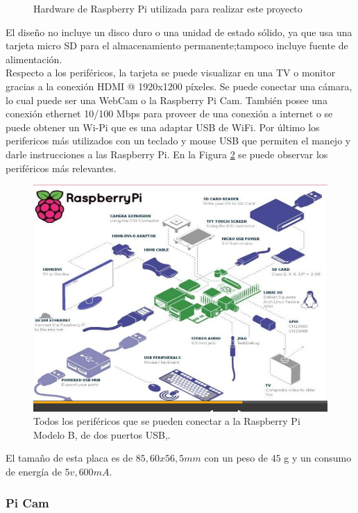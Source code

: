 \documentclass[letterpaper,12pt]{article}
\begin{document}
\begin{figure}[H]
\caption{Hardware de Raspberry Pi utilizada para realizar este proyecto}
\label{Fig:Rpi}
\end{figure}


El diseño no incluye un disco duro o una unidad de estado sólido, ya que usa una tarjeta micro SD para el almacenamiento permanente;tampoco incluye fuente de alimentación\cite{TrabajoRaspiUdeC}.\\
Respecto a los periféricos, la tarjeta se puede visualizar en una TV o monitor gracias a la conexión HDMI @ 1920x1200 píxeles. Se puede conectar una cámara, lo cual puede ser una WebCam o la Raspberry Pi Cam. También posee una conexión ethernet 10/100 Mbps para proveer de una conexión a internet o se puede obtener un Wi-Pi que es una adaptar USB de WiFi. Por último los perifericos más utilizados con un teclado y mouse USB que permiten el manejo y darle instrucciones a las Raspberry Pi. En la Figura \ref{Fig:ComponentesRpi} se puede observar los periféricos más relevantes.
\begin{figure}[H]
\centering
\includegraphics[scale=0.3]{Figs/Perifericos.png}
\caption{Todos los periféricos que se pueden conectar a la Raspberry Pi Modelo B, de dos puertos USB,\cite{HardwarePiPeri}.}
\label{Fig:ComponentesRpi}
\end{figure}


El tamaño de esta placa es de $85,60x56,5mm$ con un peso de $45$ g y un consumo de energía de $5v, 600mA$. 





\subsubsection{Pi Cam}
\end{document}
